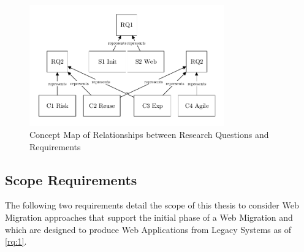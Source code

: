 \pagebreak

\begin{figure}[hbt]
\hypertarget{fig:rq-req}{%
\centering%
\includegraphics[width=0.75\textwidth]{../figures/rq-req.pdf}%
\caption[Research Questions and Requirements]{Concept Map of Relationships between Research Questions and Requirements}%
\label{fig:rq-req}%
}
\end{figure}

\hypertarget{scope-requirements}{%
\subsection{Scope Requirements}\label{scope-requirements}}
\vspace{10pt}

The following two requirements detail the scope of this thesis to consider \gls{Web Migration} approaches that support the initial phase of a \gls{Web Migration} and which are designed to produce \glspl{Web Application} from \glspl{Legacy System} as of \cref{rq:1}.

